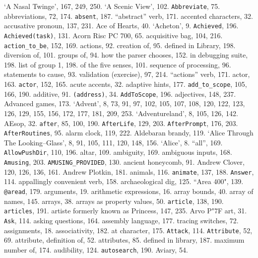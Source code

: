 `A Nasal Twinge', 167, 249, 250.
`A Scenic View', 102.
{{\tt Abbreviate}}, 75.
abbreviations, 72, 174.
{{\tt absent}}, 187.
``abstract'' verb, 171.
accented characters, 32.
accusative pronoun, 137, 231.
Ace of Hearts, 40.
`Acheton', 9.
{{\tt Achieved}}, 196.
{{\tt Achieved(task)}}, 131.
Acorn Risc PC 700, 65.
acquisitive bag, 104, 216.
{{\tt action\_to\_be}}, 152, 169.
actions, 92.
\quad  creation of, 95.
\quad  defined in Library, 198.
\quad  diversion of, 101.
\quad  groups of, 94.
\quad  how the parser chooses, 152.
\quad  in debugging suite, 198.
\quad  list of group 1, 198.
\quad  of the five senses, 101.
\quad  sequence of processing, 96.
\quad  statements to cause, 93.
\quad  validation (exercise), 97, 214.
``actions'' verb, 171.
actor, 163.
{{\tt actor}}, 152, 165.
acute accents, 32.
adaptive hints, 177.
{{\tt add\_to\_scope}}, 105, 166, 190.
additive, 91.
{{\tt (address)}}, 34.
{{\tt AddToScope}}, 196.
adjectives, 148, 237.
Advanced games, 173.
`Advent', 8, 73, 91, 97, 102, 105, 107, 108, 120, 122, 123, 126, 129, 155, 156, 172, 177, 181, 209, 253.
`Adventureland', 8, 105, 126, 142.
AEsop, 32.
{{\tt after}}, 85, 100, 190.
{{\tt AfterLife}}, 129, 203.
{{\tt AfterPrompt}}, 176, 203.
{{\tt AfterRoutines}}, 95.
alarm clock, 119, 222.
Aldebaran brandy, 119.
`Alice Through The Looking\---Glass', 8, 91, 105, 111, 120, 148, 156.
`Alice', 8.
``all'', 169.
{{\tt AllowPushDir}}, 110, 196.
altar, 109.
ambiguity, 169.
ambiguous inputs, 168.
{{\tt Amusing}}, 203.
{{\tt AMUSING\_PROVIDED}}, 130.
ancient honeycomb, 91.
Andrew Clover, 120, 126, 136, 161.
Andrew Plotkin, 181.
animals, 116.
{{\tt animate}}, 137, 188.
{{\tt Answer}}, 114.
appallingly convenient verb, 158.
archaeological dig, 125.
``Area 400", 139.
{{\tt @aread}}, 179.
arguments, 19.
arithmetic expressions, 16.
array bounds, 40.
array of {\fam \ttfam \tentt name}s, 145.
arrays, 38.
arrays as property values, 50.
{{\tt article}}, 138, 190.
{{\tt articles}}, 191.
artiste formerly known as Princess, 147, 235.
Arvo P{\accent "7F a}rt, 31.
{{\tt Ask}}, 114.
asking questions, 164.
assembly language, 177.
\quad  tracing switches, 72.
assignments, 18.
associativity, 182.
at character, 175.
{{\tt Attack}}, 114.
{{\tt Attribute}}, 52, 69.
attribute, definition of, 52.
attributes, 85.
\quad  defined in library, 187.
\quad  maximum number of, 174.
audibility, 124.
{{\tt autosearch}}, 190.
Aviary, 54.

